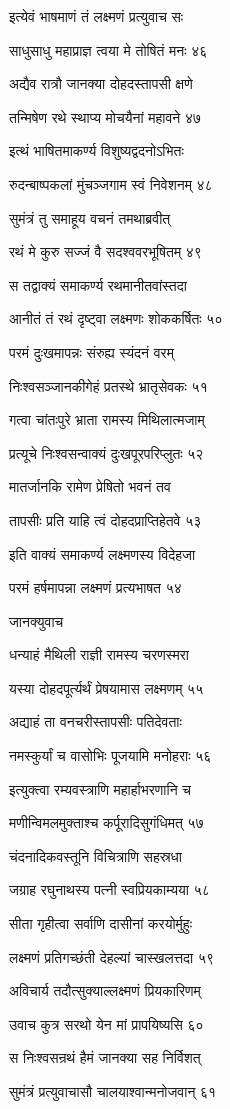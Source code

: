 इत्येवं भाषमाणं तं लक्ष्मणं प्रत्युवाच सः

साधुसाधु महाप्राज्ञ त्वया मे तोषितं मनः ४६

अद्यैव रात्रौ जानक्या दोहदस्तापसी क्षणे

तन्मिषेण रथे स्थाप्य मोचयैनां महावने ४७

इत्थं भाषितमाकर्ण्य विशुष्यद्वदनोऽभितः

रुदन्बाष्पकलां मुंचञ्जगाम स्वं निवेशनम् ४८

सुमंत्रं तु समाहूय वचनं तमथाब्रवीत्

रथं मे कुरु सज्जं वै सदश्ववरभूषितम् ४९

स तद्वाक्यं समाकर्ण्य रथमानीतवांस्तदा

आनीतं तं रथं दृष्ट्वा लक्ष्मणः शोककर्षितः ५०

परमं दुःखमापन्नः संरुह्य स्यंदनं वरम्

निःश्वसञ्जानकीगेहं प्रतस्थे भ्रातृसेवकः ५१

गत्वा चांतःपुरे भ्राता रामस्य मिथिलात्मजाम्

प्रत्यूचे निःश्वसन्वाक्यं दुःखपूरपरिप्लुतः ५२

मातर्जानकि रामेण प्रेषितो भवनं तव

तापसीः प्रति याहि त्वं दोहदप्राप्तिहेतवे ५३

इति वाक्यं समाकर्ण्य लक्ष्मणस्य विदेहजा

परमं हर्षमापन्ना लक्ष्मणं प्रत्यभाषत ५४

जानक्युवाच

धन्याहं मैथिली राज्ञी रामस्य चरणस्मरा

यस्या दोहदपूर्त्यर्थं प्रेषयामास लक्ष्मणम् ५५

अद्याहं ता वनचरीस्तापसीः पतिदेवताः

नमस्कुर्यां च वासोभिः पूजयामि मनोहराः ५६

इत्युक्त्वा रम्यवस्त्राणि महार्हाभरणानि च

मणीन्विमलमुक्ताश्च कर्पूरादिसुगंधिमत् ५७

चंदनादिकवस्तूनि विचित्राणि सहस्रधा

जग्राह रघुनाथस्य पत्नी स्वप्रियकाम्यया ५८

सीता गृहीत्वा सर्वाणि दासीनां करयोर्मुहुः

लक्ष्मणं प्रतिगच्छंती देहल्यां चास्खलत्तदा ५९

अविचार्य तदौत्सुक्याल्लक्ष्मणं प्रियकारिणम्

उवाच कुत्र सरथो येन मां प्रापयिष्यसि ६०

स निःश्वसन्रथं हैमं जानक्या सह निर्विशत्

सुमंत्रं प्रत्युवाचासौ चालयाश्वान्मनोजवान् ६१

